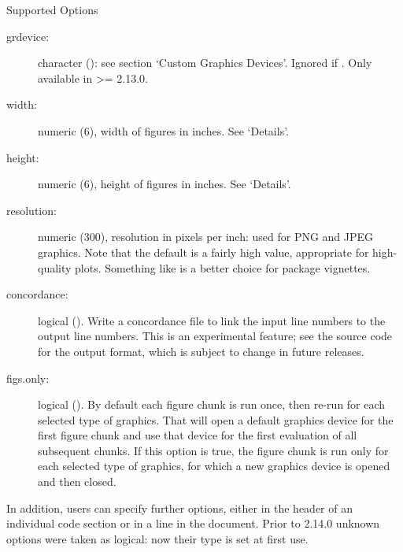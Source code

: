 \begin{Section}{Supported Options}
\begin{description}
\item[grdevice:] character (): see section `Custom
Graphics Devices'.  Ignored if .  Only
available in \R{} >= 2.13.0.

\item[width:] numeric (6), width of figures in inches.  See
`Details'.

\item[height:] numeric (6), height of figures in inches.  See
`Details'.

\item[resolution:] numeric (300), resolution in pixels per inch:
used for PNG and JPEG graphics.  Note that the default is a fairly
high value, appropriate for high-quality plots.  Something like
 is a better choice for package vignettes.

\item[concordance:] logical ().  Write a concordance
file to link the input line numbers to the output line numbers.
This is an experimental feature; see the source code for the
output format, which is subject to change in future releases.

\item[figs.only:] logical ().
By default each figure chunk is run once, then re-run for each
selected type of graphics.  That will open a default graphics
device for the first figure chunk and use that device for the first
evaluation of all subsequent chunks.  If this option is true, the
figure chunk is run only for each selected type of graphics, for
which a new graphics device is opened and then closed.

\end{description}


In addition, users can specify further options, either in the header
of an individual code section or in a  line in
the document. Prior to \R{} 2.14.0 unknown options were taken as
logical: now their type is set at first use.
\end{Section}
%
